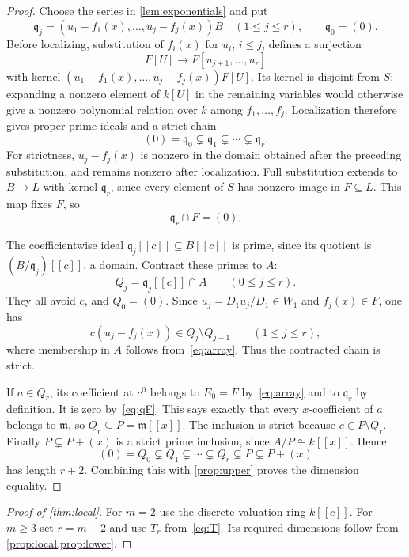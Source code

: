 \documentclass[11pt,reqno]{amsart}
\numberwithin{equation}{section}
\theoremstyle{plain}
\theoremstyle{definition}
\theoremstyle{remark}
\newcommand{\m}{\mathfrak m}
\newcommand{\q}{\mathfrak q}
\begin{document}
\begin{proof}
Choose the series in \cref{lem:exponentials} and put
\[
 \q_j=(u_1-f_1(x),\ldots,u_j-f_j(x))B\quad(1\le j\le r),
 \qquad\q_0=(0).
\]
Before localizing, substitution of $f_i(x)$ for $u_i$, $i\le j$,
defines a surjection
\[
 F[U]\longrightarrow F[u_{j+1},\ldots,u_r]
\]
with kernel $(u_1-f_1(x),\ldots,u_j-f_j(x))F[U]$.
Its kernel is disjoint from $S$: expanding a nonzero element of
$k[U]$ in the remaining variables would otherwise give a nonzero
polynomial relation over $k$ among $f_1,\ldots,f_j$.
Localization therefore gives proper prime ideals and a strict chain
\begin{equation}\label{eq:qchain}
 (0)=\q_0\subsetneq\q_1\subsetneq\cdots\subsetneq\q_r.
\end{equation}
For strictness, $u_j-f_j(x)$ is nonzero in the domain obtained
after the preceding substitution, and remains nonzero after
localization. Full substitution extends to $B\longrightarrow L$
with kernel $\q_r$, since every element of $S$ has nonzero image
in $F\subseteq L$. This map fixes $F$, so
\begin{equation}\label{eq:qF}
 \q_r\cap F=(0).
\end{equation}

The coefficientwise ideal $\q_j[[c]]\subseteq B[[c]]$ is prime,
since its quotient is $(B/\q_j)[[c]]$, a domain.
Contract these primes to $A$:
\[
 Q_j=\q_j[[c]]\cap A\qquad(0\le j\le r).
\]
They all avoid $c$, and $Q_0=(0)$.
Since $u_j=D_1u_j/D_1\in W_1$ and $f_j(x)\in F$, one has
\[
 c(u_j-f_j(x))\in Q_j\setminus Q_{j-1}
 \qquad(1\le j\le r),
\]
where membership in $A$ follows from~\eqref{eq:array}.
Thus the contracted chain is strict.

If $a\in Q_r$, its coefficient at $c^0$ belongs to $E_0=F$
by~\eqref{eq:array} and to $\q_r$ by definition. It is zero
by~\eqref{eq:qF}. This says exactly that every $x$-coefficient
of $a$ belongs to $\m$, so $Q_r\subseteq P=\m[[x]]$.
The inclusion is strict because $c\in P\setminus Q_r$.
Finally $P\subsetneq P+(x)$ is a strict prime inclusion, since
$A/P\cong k[[x]]$. Hence
\begin{equation}\label{eq:final-chain}
 (0)=Q_0\subsetneq Q_1\subsetneq\cdots\subsetneq Q_r
       \subsetneq P\subsetneq P+(x)
\end{equation}
has length $r+2$. Combining this with \cref{prop:upper} proves
the dimension equality.
\end{proof}

\begin{proof}[Proof of \cref{thm:local}]
For $m=2$ use the discrete valuation ring $k[[c]]$.
For $m\ge3$ set $r=m-2$ and use $T_r$ from~\eqref{eq:T}.
Its required dimensions follow from \cref{prop:local,prop:lower}.
\end{proof}
\end{document}
